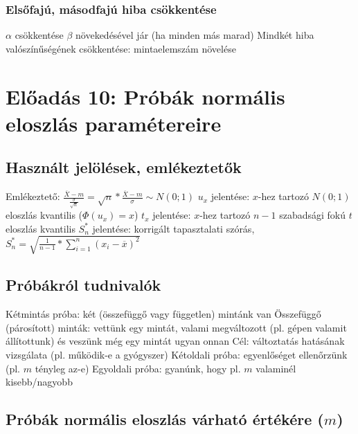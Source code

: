 \documentclass[12pt,a4paper]{article}
\begin{document}
\subsubsection{Elsőfajú, másodfajú hiba csökkentése}

\begin{outline}
	\1 $\alpha$ csökkentése $\beta$ növekedésével jár (ha minden más marad)
	\1 Mindkét hiba valószínűségének csökkentése: mintaelemszám növelése
\end{outline}

\pagebreak

\section{Előadás 10: Próbák normális eloszlás paramétereire}

\subsection{Használt jelölések, emlékeztetők}

\begin{outline}
	\1 Emlékeztető: $\frac{\overline{X}-m}{\frac{\sigma}{\sqrt{n}}}
	= \sqrt{n} * \frac{\overline{X}-m}{\sigma} \sim N(0;1)$
	\1 $u_x$ jelentése: $x$-hez tartozó $N(0;1)$ eloszlás kvantilis ($\Phi(u_x) = x$)
	\1 $t_x$ jelentése: $x$-hez tartozó $n-1$ szabadsági fokú $t$ eloszlás kvantilis
	\1 $S^*_n$ jelentése: korrigált tapasztalati szórás, $S^*_n = \sqrt{\frac{1}{n-1}*\sum_{i=1}^{n} (x_i - \overline{x})^2}$
\end{outline}

\subsection{Próbákról tudnivalók}

\begin{outline}
	\1 Kétmintás próba: két (összefüggő vagy független) mintánk van
	\1 Összefüggő (párosított) minták: vettünk egy mintát, valami megváltozott
	(pl. gépen valamit állítottunk) és veszünk még egy mintát ugyan onnan
		\2 Cél: változtatás hatásának vizsgálata (pl. működik-e a gyógyszer)
	\1 Kétoldali próba: egyenlőséget ellenőrzünk (pl. $m$ tényleg az-e)
	\1 Egyoldali próba: gyanúnk, hogy pl. $m$ valaminél kisebb/nagyobb
\end{outline}

\pagebreak

\subsection{Próbák normális eloszlás várható értékére ($m$)}
\end{document}
